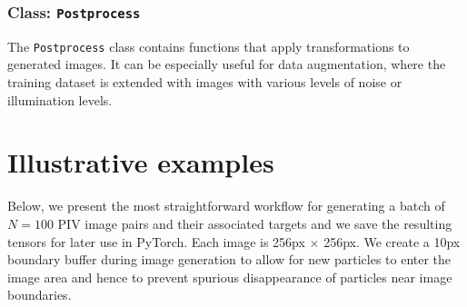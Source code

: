 \documentclass[a4paper,fleqn]{cas-dc}
\begin{document}
\subsubsection{Class: \texttt{Postprocess}} \label{sec:class-Postprocess}

The \texttt{Postprocess} class contains functions that apply transformations to generated images. It can be especially useful for data augmentation, where the training dataset is extended with images with various levels of noise or illumination levels.

\section{Illustrative examples} \label{sec:examples}

Below, we present the most straightforward workflow for generating a batch of $N=100$ PIV image pairs and their associated targets and we save the resulting tensors for later use in PyTorch. Each image is 256px $\times$ 256px. We create a 10px boundary buffer during image generation to allow for new particles to enter the image area and hence to prevent spurious disappearance of particles near image boundaries.
\end{document}
